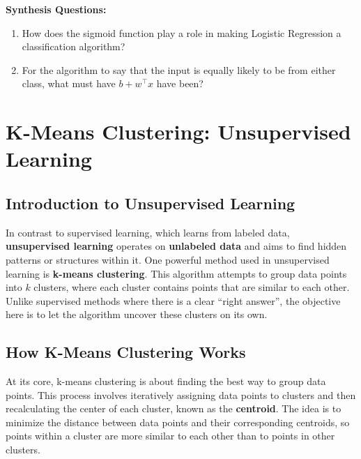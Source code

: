 \begin{questionbox}
\textbf{Synthesis Questions:}
\begin{enumerate}
    \item How does the sigmoid function play a role in making Logistic Regression a classification algorithm?
    \item For the algorithm to say that the input is equally likely to be from either class, what must have $b + w^{\top}x$ have been?
\end{enumerate}
\end{questionbox}

\section{K-Means Clustering: Unsupervised Learning}
\subsection{Introduction to Unsupervised Learning}
    \large In contrast to supervised learning, which learns from labeled data, \textbf{unsupervised learning} operates on \textbf{unlabeled data} and aims to find hidden patterns or structures within it. One powerful method used in unsupervised learning is \textbf{k-means clustering}. This algorithm attempts to group data points into \( k \) clusters, where each cluster contains points that are similar to each other. Unlike supervised methods where there is a clear ``right answer'', the objective here is to let the algorithm uncover these clusters on its own.

\subsection{How K-Means Clustering Works}
    \large At its core, k-means clustering is about finding the best way to group data points. This process involves iteratively assigning data points to clusters and then recalculating the center of each cluster, known as the \textbf{centroid}. The idea is to minimize the distance between data points and their corresponding centroids, so points within a cluster are more similar to each other than to points in other clusters.

